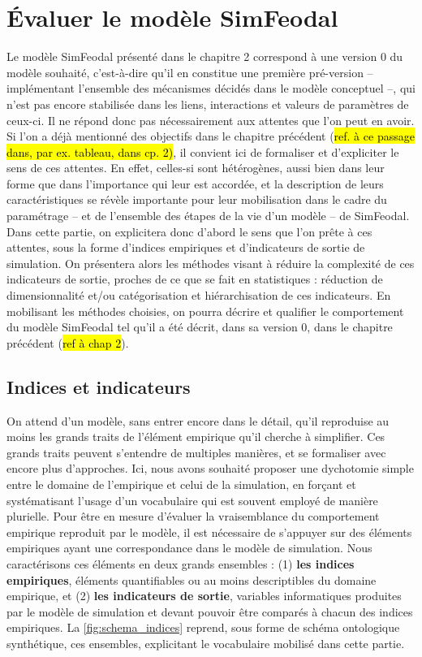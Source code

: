 \clearpage
\section[Évaluer SimFeodal]{Évaluer le modèle SimFeodal}

Le modèle SimFeodal présenté dans le chapitre 2 correspond à une \og version 0\fg{} du modèle souhaité, c'est-à-dire qu'il en constitue une première pré-version -- implémentant l'ensemble des mécanismes décidés dans le modèle conceptuel --, qui n'est pas encore stabilisée dans les liens, interactions et valeurs de paramètres de ceux-ci.
Il ne répond donc pas nécessairement aux attentes que l'on peut en avoir.
Si l'on a déjà mentionné des objectifs dans le chapitre précédent (\hl{ref. à ce passage dans, par ex. tableau, dans cp. 2)}, il convient ici de formaliser et d'expliciter le sens de ces attentes.
En effet, celles-si sont hétérogènes, aussi bien dans leur forme que dans l'importance qui leur est accordée, et la description de leurs caractéristiques se révèle importante pour leur mobilisation dans le cadre du paramétrage -- et de l'ensemble des étapes de la vie d'un modèle -- de SimFeodal.
Dans cette partie, on explicitera donc d'abord le sens que l'on prête à ces attentes, sous la forme d'indices empiriques et d'indicateurs de sortie de simulation.
On présentera alors les méthodes visant à réduire la complexité de ces indicateurs de sortie, proches de ce que se fait en statistiques :
réduction de dimensionnalité et/ou catégorisation et hiérarchisation de ces indicateurs.
En mobilisant les méthodes choisies, on pourra décrire et qualifier le comportement du modèle SimFeodal tel qu'il a été décrit, dans sa version 0, dans le chapitre précédent (\hl{ref à chap 2}).

\subsection{Indices et indicateurs}

On attend d'un modèle, sans entrer encore dans le détail, qu'il reproduise au moins les grands traits de l'élément empirique qu'il cherche à simplifier.
Ces grands traits peuvent s'entendre de multiples manières, et se formaliser avec encore plus d'approches.
Ici, nous avons souhaité proposer une dychotomie simple entre le domaine de l'empirique et celui de la simulation, en forçant et systématisant l'usage d'un vocabulaire qui est souvent employé de manière plurielle.
Pour être en mesure d'évaluer la vraisemblance du comportement empirique reproduit par le modèle, il est nécessaire de s'appuyer sur des éléments empiriques ayant une correspondance dans le modèle de simulation.
Nous caractérisons ces éléments en deux grands ensembles :
(1) \textbf{les indices empiriques}, éléments quantifiables ou au moins descriptibles du domaine empirique, et  (2) \textbf{les indicateurs de sortie}, variables informatiques produites par le modèle de simulation et devant pouvoir être comparés à chacun des indices empiriques.
La \cref{fig:schema_indices} reprend, sous forme de schéma ontologique synthétique, ces ensembles, explicitant le vocabulaire mobilisé dans cette partie.

